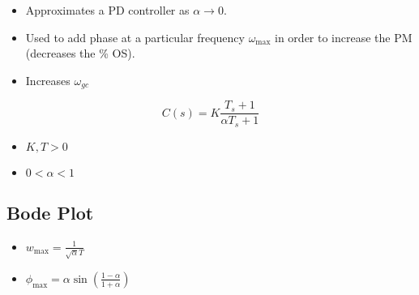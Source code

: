 \begin{motivation}
    \begin{itemize}
        \item Approximates a PD controller as $\alpha \to 0$.
        \item Used to add phase at a particular frequency $\omega_{\max}$ in order to increase the PM (decreases the \% OS).
        \item Increases $\omega_{gc}$
    \end{itemize}
\end{motivation}

\begin{definition}
    \begin{equation}
        C(s) = K \frac{T_s + 1}{\alpha T_s + 1}
    \end{equation}
    \begin{itemize}
        \item $K, T > 0$
        \item $0 < \alpha < 1$
    \end{itemize}
\end{definition}

\subsection{Bode Plot}
\begin{notes}
    \begin{itemize}
        \item $w_{\max} = \frac{1}{\sqrt{\alpha} T}$
        \item $\phi_{\max} = \alpha \sin \left(\frac{1-\alpha}{1+\alpha}\right)$
    \end{itemize}
\end{notes}


